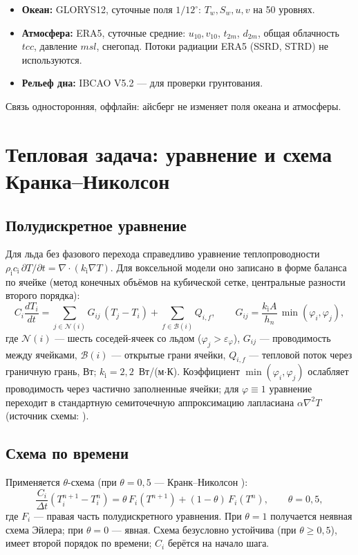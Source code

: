 \documentclass[12pt,a4paper]{article}
\newcommand{\rhoi}{\rho_{\mathrm i}}
\newcommand{\ci}{c_{\mathrm i}}
\newcommand{\ki}{k_{\mathrm i}}
\begin{document}
\begin{itemize}
\item \textbf{Океан:} GLORYS12, суточные поля $1/12^\circ$: $T_w,S_w,u,v$ на 50 уровнях.
\item \textbf{Атмосфера:} ERA5, суточные средние: $u_{10},v_{10}$, $t_{2m}$, $d_{2m}$, общая облачность $tcc$, давление $msl$, снегопад. Потоки радиации ERA5 (SSRD, STRD) не используются.
\item \textbf{Рельеф дна:} IBCAO V5.2 --- для проверки грунтования.
\end{itemize}
Связь односторонняя, оффлайн: айсберг не изменяет поля океана и атмосферы.

\section{Тепловая задача: уравнение и схема Кранка--Николсон}\label{sec:cn}

\subsection{Полудискретное уравнение}
Для льда без фазового перехода справедливо уравнение теплопроводности $\rhoi\ci\,\partial T/\partial t=\nabla\!\cdot(\ki\nabla T)$. Для воксельной модели оно записано в форме баланса по ячейке (метод конечных объёмов на кубической сетке, центральные разности второго порядка):
\begin{equation}
C_i\frac{dT_i}{dt}=\sum_{j\in\mathcal N(i)}G_{ij}\,(T_j-T_i)+\sum_{f\in\mathcal B(i)}Q_{i,f},\qquad
G_{ij}=\frac{\ki A}{h_n}\,\min(\varphi_i,\varphi_j),
\end{equation}
где $\mathcal N(i)$ --- шесть соседей-ячеек со льдом ($\varphi_j>\varepsilon_\varphi$), $G_{ij}$ --- проводимость между ячейками, $\mathcal B(i)$ --- открытые грани ячейки, $Q_{i,f}$ --- тепловой поток через граничную грань, Вт; $\ki=2{,}2$~Вт/(м$\cdot$К). Коэффициент $\min(\varphi_i,\varphi_j)$ ослабляет проводимость через частично заполненные ячейки; для $\varphi\equiv1$ уравнение переходит в стандартную семиточечную аппроксимацию лапласиана $\alpha\nabla^2T$ (источник схемы: \cite{samarskii1977}).

\subsection{Схема по времени}
Применяется $\theta$-схема (при $\theta=0{,}5$ --- Кранк--Николсон \cite{crank1947}):
\begin{equation}
\frac{C_i}{\Delta t}\left(T_i^{n+1}-T_i^{n}\right)=\theta\,F_i\!\left(T^{n+1}\right)+(1-\theta)\,F_i\!\left(T^{n}\right),\qquad\theta=0{,}5,
\end{equation}
где $F_i$ --- правая часть полудискретного уравнения. При $\theta=1$ получается неявная схема Эйлера; при $\theta=0$ --- явная. Схема безусловно устойчива (при $\theta\ge0{,}5$), имеет второй порядок по времени; $C_i$ берётся на начало шага.
\end{document}
